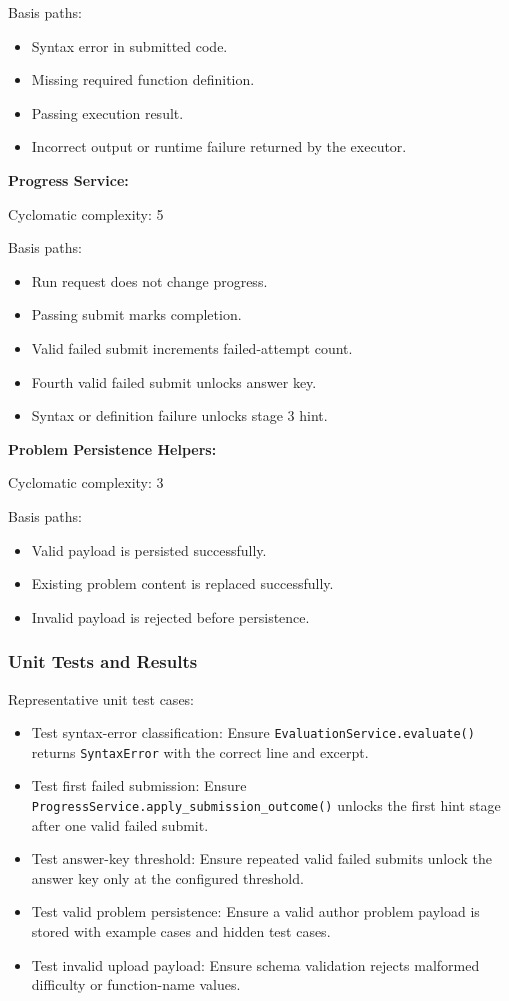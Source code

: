 Basis paths:
\begin{itemize}
    \item Syntax error in submitted code.
    \item Missing required function definition.
    \item Passing execution result.
    \item Incorrect output or runtime failure returned by the executor.
\end{itemize}

\textbf{Progress Service:}

Cyclomatic complexity: 5

Basis paths:
\begin{itemize}
    \item Run request does not change progress.
    \item Passing submit marks completion.
    \item Valid failed submit increments failed-attempt count.
    \item Fourth valid failed submit unlocks answer key.
    \item Syntax or definition failure unlocks stage 3 hint.
\end{itemize}

\textbf{Problem Persistence Helpers:}

Cyclomatic complexity: 3

Basis paths:
\begin{itemize}
    \item Valid payload is persisted successfully.
    \item Existing problem content is replaced successfully.
    \item Invalid payload is rejected before persistence.
\end{itemize}

\subsubsection{Unit Tests and Results}
Representative unit test cases:
\begin{itemize}
    \item Test syntax-error classification: Ensure \texttt{EvaluationService.evaluate()} returns \texttt{SyntaxError} with the correct line and excerpt.
    \item Test first failed submission: Ensure \texttt{ProgressService.apply\_submission\_outcome()} unlocks the first hint stage after one valid failed submit.
    \item Test answer-key threshold: Ensure repeated valid failed submits unlock the answer key only at the configured threshold.
    \item Test valid problem persistence: Ensure a valid author problem payload is stored with example cases and hidden test cases.
    \item Test invalid upload payload: Ensure schema validation rejects malformed difficulty or function-name values.
\end{itemize}

